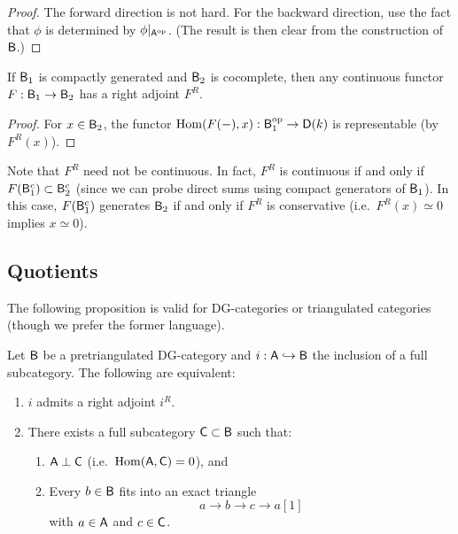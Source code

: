 \documentclass{amsart}
\begin{document}
\begin{proof}
	The forward direction is not hard.
	For the backward direction, use the fact that $\phi$ is determined by $\phi|_{\mathsf{A}^{\mathrm{op}}}$.
	(The result is then clear from the construction of $\mathsf{B}$.)
\end{proof}

\begin{cor}
	If $\mathsf{B}_1$ is compactly generated and $\mathsf{B}_2$ is cocomplete, then any continuous functor $F: \mathsf{B}_1 \to \mathsf{B}_2$ has a right adjoint $F^R$.
\end{cor}

\begin{proof}
	For $x \in \mathsf{B}_2$, the functor $\operatorname{Hom}(F(-), x): \mathsf{B}_1^{\mathrm{op}} \to \mathsf{D}(k)$ is representable (by $F^R(x)$).
\end{proof}

\begin{rmk}
	Note that $F^R$ need not be continuous.
	In fact, $F^R$ is continuous if and only if $F(\mathsf{B}_1^c) \subset \mathsf{B}_2^c$ (since we can probe direct sums using compact generators of $\mathsf{B}_1$).
	In this case, $F(\mathsf{B}_1^c)$ generates $\mathsf{B}_2$ if and only if $F^R$ is conservative (i.e.\ $F^R(x) \simeq 0$ implies $x \simeq 0$).
\end{rmk}

\subsection{Quotients}

The following proposition is valid for DG-categories or triangulated categories (though we prefer the former language).

\begin{prop}
	Let $\mathsf{B}$ be a pretriangulated DG-category and $i: \mathsf{A} \hookrightarrow \mathsf{B}$ the inclusion of a full subcategory.
	The following are equivalent:
	\begin{enumerate}
		\item $i$ admits a right adjoint $i^R$.
		\item There exists a full subcategory $\mathsf{C} \subset \mathsf{B}$ such that:
			\begin{enumerate}
				\item $\mathsf{A} \perp \mathsf{C}$ (i.e.\ $\operatorname{Hom}(\mathsf{A}, \mathsf{C}) = 0$), and 
				\item Every $b \in \mathsf{B}$ fits into an exact triangle
				\[
					a \to b \to c \to a[1]
				\]
				with $a \in \mathsf{A}$ and $c \in \mathsf{C}$.
			\end{enumerate}
	\end{enumerate}
\end{prop}
\end{document}
